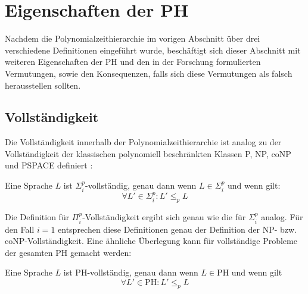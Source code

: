 \chapter{Eigenschaften der PH} \label{chapter: Eigenschaften der PH}
Nachdem die Polynomialzeithierarchie im vorigen Abschnitt über drei verschiedene Definitionen eingeführt wurde, beschäftigt sich dieser Abschnitt mit 
weiteren Eigenschaften der PH und den in der Forschung formulierten Vermutungen, sowie den Konsequenzen, falls sich diese Vermutungen als falsch herausstellen sollten.

\section{Vollständigkeit} \label{section: Vollständige Mengen innerhalb der PH}
Die Vollständigkeit innerhalb der Polynomialzeithierarchie ist analog zu der Vollständigkeit der klassischen polynomiell beschränkten Klassen
P, NP, coNP und PSPACE definiert \cite{arora_computational_2009}:

\begin{definition} \cite{arora_computational_2009}
    Eine Sprache $L$ ist $\Sigma^p_i$-vollständig, genau dann wenn $L \in \Sigma^p_i$ und wenn gilt: 
    $$
    \forall L' \in \Sigma^p_i : L' \leq_p L
    $$
\end{definition}

Die Definition für $\Pi^p_i$-Vollständigkeit ergibt sich genau wie die für $\Sigma^p_i$ analog.
Für den Fall $i = 1$ entsprechen diese Definitionen genau der Definition der NP- bzw. coNP-Vollständigkeit.
Eine ähnliche Überlegung kann für vollständige Probleme der gesamten PH gemacht werden:

\begin{definition}[PH-Vollständigkeit] \cite{arora_computational_2009}
    Eine Sprache $L$ ist PH-vollständig, genau dann wenn $L \in \text{PH}$ und wenn gilt 
    $$
    \forall L' \in \text{PH} : L' \leq_p L
    $$
\end{definition}

